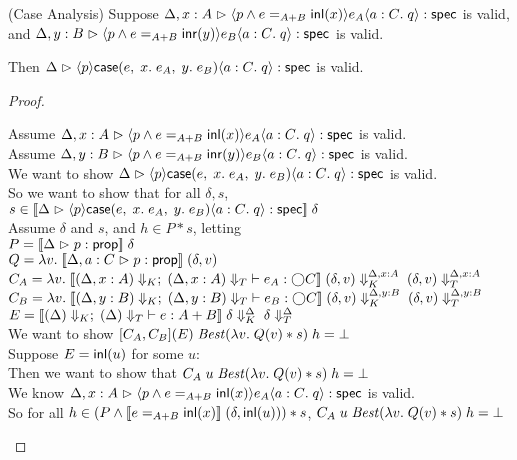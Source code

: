 \begin{lemma}{(Case Analysis)}
  Suppose $\judgeS[\Delta,x:A]{\mspec{p \land e =_{A+B} \inl(x)}{e_A}{a:C}{q}}$ is valid,
      and $\judgeS[\Delta,y:B]{\mspec{p \land e =_{A+B} \inr(y)}{e_B}{a:C}{q}}$ is valid.

Then $\judgeS{\mspec{p}{\Case{e}{x}{e_A}{y}{e_B}}{a:C}{q}}$ is valid. 
\end{lemma}

\begin{proof}
\begin{tabbedproof}
\oo Assume $\judgeS[\Delta,x:A]{\mspec{p \land e =_{A+B} \inl(x)}{e_A}{a:C}{q}}$ is valid. \\
\oo Assume $\judgeS[\Delta,y:B]{\mspec{p \land e =_{A+B} \inr(y)}{e_B}{a:C}{q}}$ is valid. \\
\ooo We want to show $\judgeS{\mspec{p}{\Case{e}{x}{e_A}{y}{e_B}}{a:C}{q}}$ is valid. \\
\ooo So we want to show that for all $\delta, s$, $s \in \interp{\judgeS{\mspec{p}{\Case{e}{x}{e_A}{y}{e_B}}{a:C}{q}}}\;\delta$ \\
\ooo Assume $\delta$ and $s$, and $h \in P * s$, letting \\
\ooox $P = \interp{\judgeA{p}{\assert}}\;\delta$ \\
\ooox $Q = \semfun{v}{\interp{\judgeA[\Delta, a:C]{p}{\assert}}\;(\delta,v)}$ \\
\ooox $C_A = \semfun{v}{\interp{\judgeE[\restrictkind{\Delta, x:A}]{\restricttype{\Delta, x:A}}{e_A}{\monad{C}}}\;\restricttyenv{\Delta,x:A}{(\delta,v)}\;\restrictvals{\Delta, x:A}{(\delta,v)}}$ \\
\ooox $C_B = \semfun{v}{\interp{\judgeE[\restrictkind{\Delta, y:B}]{\restricttype{\Delta, y:B}}{e_B}{\monad{C}}}\;\restricttyenv{\Delta,y:B}{(\delta,v)}\;\restrictvals{\Delta, y:B}{(\delta,v)}}$ \\
\ooox $E = \interp{\judgeE[\restrictkind{\Delta}]{\restricttype{\Delta}}{e}{A+B}}\;\restricttyenv{\Delta}{\delta}\;\restrictvals{\Delta}{\delta}$ \\
\oooo We want to show $[C_A,C_B](E)\;\mathit{Best}(\semfun{v}{Q(v)*s})\;h = \bot$\\
\oooo Suppose $E = \inl(u)$ for some $u$: \\
\ooooo Then we want to show that $C_A\;u\;\mathit{Best}(\semfun{v}{Q(v)*s})\;h = \bot$\\
\ooooo We know $\judgeS[\Delta,x:A]{\mspec{p \land e =_{A+B} \inl(x)}{e_A}{a:C}{q}}$ is valid. \\
\ooooo So for all $h \in (P \land \interp{e =_{A+B} \inl(x)}\;(\delta,\inl(u))) * s$, $C_A\;u\;\mathit{Best}(\semfun{v}{Q(v)*s})\;h = \bot$\\

\end{tabbedproof}
\end{proof}
